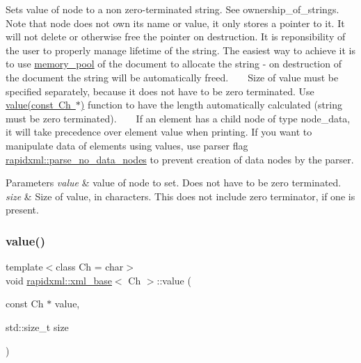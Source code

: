 Sets value of node to a non zero-\/terminated string. See ownership\+\_\+of\+\_\+strings. ~\newline
~\newline
 Note that node does not own its name or value, it only stores a pointer to it. It will not delete or otherwise free the pointer on destruction. It is reponsibility of the user to properly manage lifetime of the string. The easiest way to achieve it is to use \mbox{\hyperlink{classrapidxml_1_1memory__pool}{memory\+\_\+pool}} of the document to allocate the string -\/ on destruction of the document the string will be automatically freed. ~\newline
~\newline
 Size of value must be specified separately, because it does not have to be zero terminated. Use \mbox{\hyperlink{classrapidxml_1_1xml__base_a81e63ec4bfd2d7ef0a6c2ed49be6e623}{value(const Ch $\ast$)}} function to have the length automatically calculated (string must be zero terminated). ~\newline
~\newline
 If an element has a child node of type node\+\_\+data, it will take precedence over element value when printing. If you want to manipulate data of elements using values, use parser flag \mbox{\hyperlink{namespacerapidxml_ac2d21ef14a4e8936b94aca5d38b1a74d}{rapidxml\+::parse\+\_\+no\+\_\+data\+\_\+nodes}} to prevent creation of data nodes by the parser. 
\begin{DoxyParams}{Parameters}
{\em value} & value of node to set. Does not have to be zero terminated. \\
\hline
{\em size} & Size of value, in characters. This does not include zero terminator, if one is present. \\
\hline
\end{DoxyParams}
\mbox{\label{classrapidxml_1_1xml__base_a3b183c2db7022a6d30494dd2f0ac11e9}} 
\subsubsection{\texorpdfstring{value()}{value()}\hspace{0.1cm}{\footnotesize\ttfamily [4/6]}}
{\footnotesize\ttfamily template$<$class Ch  = char$>$ \\
void \mbox{\hyperlink{classrapidxml_1_1xml__base}{rapidxml\+::xml\+\_\+base}}$<$ Ch $>$\+::value (\begin{DoxyParamCaption}\item[{const Ch $\ast$}]{value,  }\item[{std\+::size\+\_\+t}]{size }\end{DoxyParamCaption})\hspace{0.3cm}{\ttfamily [inline]}}

